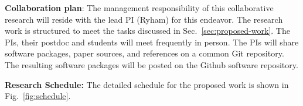 \medskip

\textbf{Collaboration plan}: 
%
The management responsibility of this collaborative research will
reside with the lead PI (Ryham) for this endeavor.  The research work is
structured to meet the tasks discussed in
Sec.~\ref{sec:proposed-work}.
%
The PIs, their postdoc and students will meet frequently in person.
The PIs will share software packages, paper sources, and references on a common
\textsf{Git} repository. The resulting software packages will be posted
on the \textsf{Github} software repository.

\medskip

\textbf{Research Schedule:} The detailed schedule for the proposed
work is shown in Fig.~\ref{fig:schedule}.


